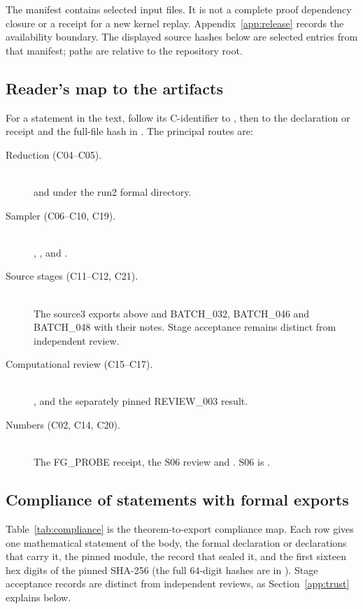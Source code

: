 The manifest contains \EvidencePinCount{} selected input files.
It is not a complete proof dependency closure or a receipt for a new
kernel replay. Appendix~\ref{app:release} records the availability
boundary. The displayed source hashes below are selected entries from
that manifest; paths are relative to the repository root.

\begin{description}\small
\SelectedSnapshotBindings
\end{description}

\subsection{Reader's map to the artifacts}
For a statement in the text, follow its C-identifier to
, then to the declaration or receipt and the full-file
hash in . The principal routes are:
\begin{description}
\item[Reduction (C04--C05).] \hfill\\
   and
   under the run2 formal directory.
\item[Sampler (C06--C10, C19).] \hfill\\
  , ,
   and .
\item[Source stages (C11--C12, C21).] \hfill\\
  The source3 exports above and
  BATCH\_032, BATCH\_046 and BATCH\_048 with their notes. Stage acceptance
  remains distinct from independent review.
\item[Computational review (C15--C17).] \hfill\\
  ,
   and the separately pinned REVIEW\_003 result.
\item[Numbers (C02, C14, C20).] \hfill\\
  The FG\_PROBE receipt, the S06 review and
  . S06 is \UNCERTIFIED.
\end{description}

\subsection{Compliance of statements with formal exports}\label{app:compliance}
Table~\ref{tab:compliance} is the theorem-to-export compliance map.
Each row gives one mathematical statement of the body, the formal
declaration or declarations that carry it, the pinned module, the
record that sealed it, and the first sixteen hex digits of the pinned
SHA-256 (the full $64$-digit hashes are in ).
Stage acceptance records are distinct from independent reviews, as
Section~\ref{app:trust} explains below.

